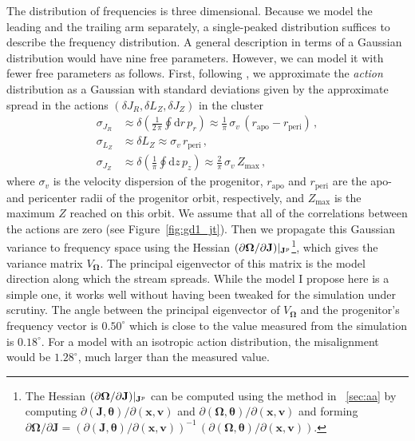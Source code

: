 \documentclass{emulateapj}
\newcommand{\dd}{\mathrm{d}}
\renewcommand{\figurename}{Figure}
\renewcommand{\vec}[1]{\ensuremath{\mathbf{#1}}}
\newcommand{\vecx}{\ensuremath{\vec{x}}}
\newcommand{\vecv}{\ensuremath{\vec{v}}}
\newcommand{\vecj}{\ensuremath{\vec{J}}}
\newcommand{\veco}{\ensuremath{\vec{\Omega}}}
\newcommand{\veca}{\ensuremath{\boldsymbol\theta}}
\newcommand{\sigv}{\ensuremath{\sigma_v}}
\begin{document}
The distribution of frequencies is three dimensional. Because we model
the leading and the trailing arm separately, a single-peaked
distribution suffices to describe the frequency distribution. A
general description in terms of a Gaussian distribution would have
nine free parameters. However, we can model it with fewer free
parameters as follows. First, following \citet{Eyre11a}, we
approximate the \emph{action} distribution as a Gaussian with standard
deviations given by the approximate spread in the actions $(\delta
J_R,\delta L_Z,\delta J_Z)$ in the cluster
\begin{align}
  \sigma_{J_R} & \approx \delta \left(\frac{1}{2\,\pi}\oint\dd r\,p_r\right) \approx \frac{1}{\pi}\,\sigv\,\left(r_{\mathrm{apo}}-r_{\mathrm{peri}}\right)\,,\\
  \sigma_{L_Z} & \approx  \delta L_Z \approx \sigv\,r_{\mathrm{peri}}\,,\\
  \sigma_{J_Z} & \approx \delta\left(\frac{1}{\pi}\oint\dd z\,p_z \right)\approx \frac{2}{\pi}\,\sigv\,Z_{\mathrm{max}}\,,
\end{align}
where $\sigv$ is the velocity dispersion of the progenitor,
$r_{\mathrm{apo}}$ and $r_{\mathrm{peri}}$ are the apo- and pericenter
radii of the progenitor orbit, respectively, and $Z_{\mathrm{max}}$ is
the maximum $Z$ reached on this orbit. We assume that all of the
correlations between the actions are zero (see
\figurename~\ref{fig:gd1_jt}). Then we propagate this Gaussian
variance to frequency space using the Hessian $(\partial \veco /
\partial \vecj)\large|_{\vecj^p}$\footnote{The Hessian $(\partial
  \veco / \partial \vecj)\large|_{\vecj^p}$ can be computed using the
  method in \appendixname~\ref{sec:aa} by computing $\partial
  (\vecj,\veca) / \partial (\vecx,\vecv)$ and $\partial (\veco,\veca)
  / \partial (\vecx,\vecv)$ and forming $\partial \veco / \partial
  \vecj = \left(\partial (\vecj,\veca) / \partial
  (\vecx,\vecv)\right)^{-1}\,\left(\partial (\veco,\veca) / \partial
  (\vecx,\vecv)\right)$.}, which gives the variance matrix
$V_\veco$. The principal eigenvector of this matrix is the model
direction along which the stream spreads. While the model I propose
here is a simple one, it works well without having been tweaked for
the simulation under scrutiny. The angle between the principal
eigenvector of $V_\veco$ and the progenitor's frequency vector is
$0.50^\circ$ which is close to the value measured from the simulation
is $0.18^\circ$. For a model with an isotropic action distribution,
the misalignment would be $1.28^\circ$, much larger than the measured
value.
\end{document}
